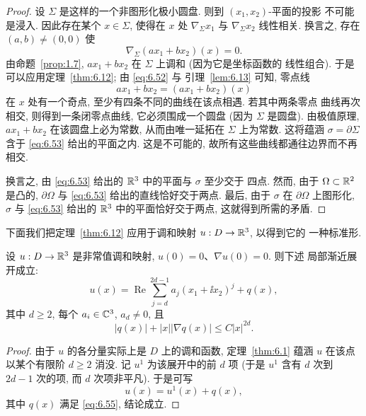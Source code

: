 \begin{proof}
设 $\Sigma$ 是这样的一个非图形化极小圆盘. 则到 $(x_1,x_2)$-平面的投影
不可能是浸入. 因此存在某个 $x\in\Sigma$, 使得在 $x$ 处
$\nabla_\Sigma x_1$ 与 $\nabla_\Sigma x_2$ 线性相关. 换言之, 存在
$(a,b)\neq(0,0)$ 使
\begin{equation}
\nabla_\Sigma(ax_1+bx_2)(x)=0.
\label{eq:6.52}
\end{equation}
由命题~\ref{prop:1.7}, $ax_1+bx_2$ 在 $\Sigma$ 上调和 (因为它是坐标函数的
线性组合). 于是可以应用定理~\ref{thm:6.12}; 由 \eqref{eq:6.52} 与
引理~\ref{lem:6.13} 可知, 零点线
\begin{equation}
ax_1+bx_2=(ax_1+bx_2)(x)
\label{eq:6.53}
\end{equation}
在 $x$ 处有一个奇点, 至少有四条不同的曲线在该点相遇. 若其中两条零点
曲线再次相交, 则得到一条闭零点曲线, 它必须围成一个圆盘 (因为 $\Sigma$
是圆盘). 由极值原理, $ax_1+bx_2$ 在该圆盘上必为常数, 从而由唯一延拓在
$\Sigma$ 上为常数. 这将蕴涵 $\sigma=\partial\Sigma$ 含于 \eqref{eq:6.53}
给出的平面之内. 这是不可能的, 故所有这些曲线都通往边界而不再相交.

换言之, 由 \eqref{eq:6.53} 给出的 $\mathbb{R}^3$ 中的平面与 $\sigma$ 至少交于
四点. 然而, 由于 $\Omega\subset\mathbb{R}^2$ 是凸的, $\partial\Omega$ 与
\eqref{eq:6.53} 给出的直线恰好交于两点. 最后, 由于 $\sigma$ 在
$\partial\Omega$ 上图形化, $\sigma$ 与 \eqref{eq:6.53} 给出的 $\mathbb{R}^3$
中的平面恰好交于两点, 这就得到所需的矛盾.
\end{proof}

下面我们把定理~\ref{thm:6.12} 应用于调和映射 $u:D\to\mathbb{R}^3$, 以得到它的
一种标准形.

\begin{lemma}
\label{lem:6.15}
设 $u:D\to\mathbb{R}^3$ 是非常值调和映射, $u(0)=0$、$\nabla u(0)=0$. 则下述
局部渐近展开成立:
\begin{equation}
u(x)=\operatorname{Re}\sum_{j=d}^{2d-1}a_j(x_1+\ii x_2)^j+q(x),
\label{eq:6.54}
\end{equation}
其中 $d\geq2$, 每个 $a_i\in\mathbb{C}^3$, $a_d\neq0$, 且
\begin{equation}
|q(x)|+|x||\nabla q(x)|\leq C|x|^{2d}.
\label{eq:6.55}
\end{equation}
\end{lemma}

\begin{proof}
由于 $u$ 的各分量实际上是 $D$ 上的调和函数, 定理~\ref{thm:6.1} 蕴涵 $u$
在该点以某个有限阶 $d\geq2$ 消没. 记 $u^1$ 为该展开中的前 $d$ 项 (于是
$u^1$ 含有 $d$ 次到 $2d-1$ 次的项, 而 $d$ 次项非平凡). 于是可写
\begin{equation*}
u(x)=u^1(x)+q(x),
\end{equation*}
其中 $q(x)$ 满足 \eqref{eq:6.55}, 结论成立.
\end{proof}


